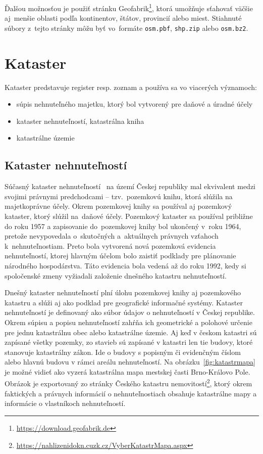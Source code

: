 Ďalšou možnosťou je použiť stránku Geofabrik\footnote{\url{https://download.geofabrik.de}}, ktorá umožňuje sťahovať väčšie aj~menšie oblasti podľa kontinentov, štátov, provincií alebo miest. Stiahnuté súbory z~tejto stránky môžu byť vo~formáte \texttt{osm.pbf}, \texttt{shp.zip} alebo \texttt{osm.bz2}.

\section{Kataster}
Kataster predstavuje register resp. zoznam a používa sa vo viacerých významoch:
\begin{itemize}
    \item súpis nehnuteľného majetku, ktorý bol vytvorený pre daňové a úradné účely
    \item kataster nehnuteľností, katastrálna kniha
    \item katastrálne územie
\end{itemize}

\subsection*{Kataster nehnuteľností}
Súčasný kataster nehnuteľností~\cite{baudys-katastranemovitosti} na území Českej republiky mal ekvivalent medzi svojimi právnymi predchodcami \--- tzv.~pozemkovú knihu, ktorá slúžila na majetkoprávne účely. Okrem pozemkovej knihy sa používal aj pozemkový kataster, ktorý slúžil na~daňové účely. Pozemkový kataster sa používal približne do roku 1957 a zapisovanie do~pozemkovej knihy bol ukončený v~roku 1964, pretože nevypovedala o~skutočných a~aktuálnych právnych vzťahoch k~nehnuteľnostiam. Preto bola vytvorená nová pozemková evidencia nehnuteľností, ktorej hlavným účelom bolo zaistiť podklady pre plánovanie národného hospodárstva. Táto evidencia bola vedená až do roku 1992, kedy si spoločenské zmeny vyžiadali založenie dnešného katastru nehnuteľností.

Dnešný kataster nehnuteľností plní úlohu pozemkovej knihy aj pozemkového katastru a slúži aj ako podklad pre geografické informačné systémy. Kataster nehnuteľností je definovaný ako súbor údajov o nehnuteľností v Českej republike. Okrem súpisu a popisu nehnuteľností zahŕňa ich geometrické a polohové určenie pre jednu katastrálnu obec alebo katastrálne územie. Aj keď v českom katastri sú zapísané všetky pozemky, zo stavieb sú zapísané v katastri len tie budovy, ktoré stanovuje katastrálny zákon. Ide o budovy s popisným či evidenčným číslom alebo hlavnú budovu v rámci areálu nehnuteľností. Na obrázku~\ref{fig:katastrmapa} je možné vidieť ako vyzerá katastrálna mapa mestskej časti Brno-Královo Pole. Obrázok je exportovaný zo stránky Českého katastru nemovitostí\footnote{\url{https://nahlizenidokn.cuzk.cz/VyberKatastrMapa.aspx}}, ktorý okrem faktických a právnych informácií o nehnuteľnostiach obsahuje katastrálne mapy a informácie o vlastníkoch nehnuteľností.

